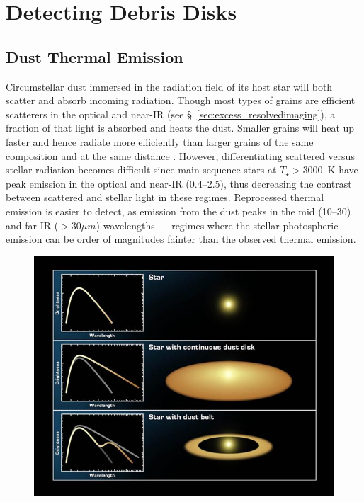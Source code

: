 \section{Detecting Debris Disks}\label{sec:detect_dd}

    \subsection{Dust Thermal Emission}

    Circumstellar dust immersed in the radiation field of its host star will both scatter and absorb incoming radiation. Though most types of grains are efficient scatterers in the optical and near-IR (see \S~\ref{sec:excess_resolvedimaging}), a fraction of that light is absorbed and heats the dust. Smaller grains will heat up faster and hence radiate more efficiently than larger grains of the same composition and at the same distance \citep{Krivov2010}. However, differentiating scattered versus stellar radiation becomes difficult since main-sequence stars at $T_\star>3000$~K have peak emission in the optical and near-IR (0.4--2.5\micron), thus decreasing the contrast between scattered and stellar light in these regimes. Reprocessed thermal emission is easier to detect, as emission from the dust peaks in the mid (10--30\micron) and far-IR ($>30\mu m$) wavelengths --- regimes where the stellar photospheric emission can be order of magnitudes fainter than the observed thermal emission.  
        
    \begin{figure}
    \centering
    \includegraphics[width=\textwidth]{Ch1/IR_Excess_diagram} 
    \caption[]{}
    \label{fig:PR_Drag_time}
    \end{figure}


